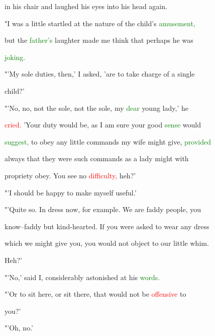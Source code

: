  in his chair and \textcolor{BurntOrange}{laughed} his eyes into his head again.



 "I was a little \textcolor{BurntOrange}{startled} at the nature of the \textcolor{BurntOrange}{child's} \textcolor{green}{amusement,}

 but the \textcolor{green}{father's} \textcolor{BurntOrange}{laughter} made me think that perhaps he was

 \textcolor{green}{joking.}



 "'My sole duties, then,' I asked, 'are to take charge of a single

 \textcolor{BurntOrange}{child?'}



 "'No, no, not the sole, not the sole, my \textcolor{green}{dear} \textcolor{BurntOrange}{young} lady,' he

 \textcolor{red}{cried.} 'Your duty would be, as I am sure your \textcolor{BurntOrange}{good} \textcolor{green}{sense} would

 \textcolor{green}{suggest,} to \textcolor{BurntOrange}{obey} any little commands my wife might give, \textcolor{green}{provided}

 always that they were such commands as a lady might with

 propriety \textcolor{BurntOrange}{obey.} You see no \textcolor{red}{difficulty,} heh?'



 "'I should be \textcolor{BurntOrange}{happy} to make myself useful.'



 "'Quite so. In dress now, for example. We are faddy people, you

 know--faddy but kind-hearted. If you were asked to \textcolor{BurntOrange}{wear} any dress

 which we might give you, you would not object to our little \textcolor{BurntOrange}{whim.}

 Heh?'



 "'No,' said I, considerably astonished at his \textcolor{green}{words.}



 "'Or to sit here, or sit there, that would not be \textcolor{red}{offensive} to

 you?'



 "'Oh, no.'



